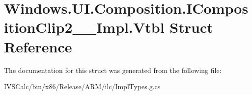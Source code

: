 \hypertarget{struct_windows_1_1_u_i_1_1_composition_1_1_i_composition_clip2_____impl_1_1_vtbl}{}\section{Windows.\+U\+I.\+Composition.\+I\+Composition\+Clip2\+\_\+\+\_\+\+Impl.\+Vtbl Struct Reference}
\label{struct_windows_1_1_u_i_1_1_composition_1_1_i_composition_clip2_____impl_1_1_vtbl}


The documentation for this struct was generated from the following file\+:\begin{DoxyCompactItemize}
\item 
I\+V\+S\+Calc/bin/x86/\+Release/\+A\+R\+M/ilc/Impl\+Types.\+g.\+cs\end{DoxyCompactItemize}
